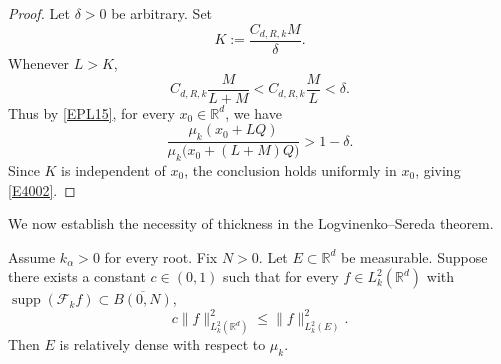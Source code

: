 \documentclass[12pt]{article}
\DeclareMathOperator{\supp}{supp}
\begin{document}
\begin{proof}
Let $\delta>0$ be arbitrary. Set
\[
K:=\frac{C_{d,R,k}M}{\delta}.
\]
Whenever $L>K$,
\[
C_{d,R,k}\frac{M}{L+M}<C_{d,R,k}\frac{M}{L}<\delta.
\]
Thus by \eqref{EPL15}, for every $x_0\in\mathbb{R}^d$, we have
\[
\frac{\mu_k(x_0+LQ)}{\mu_k\bigl(x_0+(L+M)Q\bigr)}>1-\delta.
\]
Since $K$ is independent of $x_0$, the conclusion holds uniformly in $x_0$, giving \eqref{E4002}.

\end{proof}

We now establish the necessity of thickness in the Logvinenko--Sereda theorem.

\begin{lemma}[Necessity]
\label{thm:necessity}
Assume $k_\alpha>0$ for every root. Fix $N>0$. Let $E\subset\mathbb{R}^d$ be measurable. Suppose there exists a constant $c\in(0,1)$ such that for every $f \in L_k^2(\mathbb{R}^d)$ with $\supp(\mathcal{F}_k f) \subset \overline{B(0,N)}$,
\begin{equation}
\label{eq:spectral}
c\| f \|_{L_k^2(\mathbb{R}^d)}^2 \le  \| f \|_{L_k^2(E)}^2.
\end{equation}
Then $E$ is relatively dense with respect to $\mu_k$.
\end{lemma}
\end{document}

